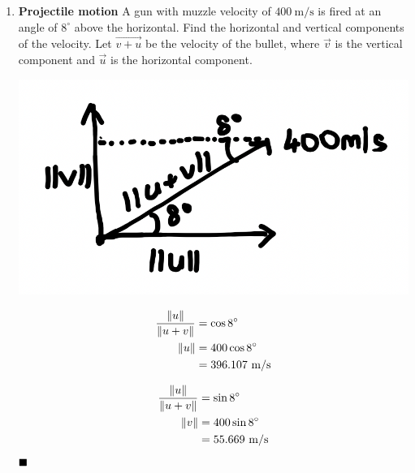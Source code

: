 \begin{enumerate}
    \item \textbf{Projectile motion} A gun with muzzle velocity of $400 \mathrm{~m} / \mathrm{s}$ is fired at an angle of $8^{\circ}$ above the horizontal. Find the horizontal and vertical components of the velocity.
          \sol{} Let $\vec{v + u}$ be the velocity of the bullet, where $\vec{v}$ is the vertical component and $\vec{u}$ is the horizontal component.
          \begin{multicols}{2}
              \begin{center}
                  \includegraphics[scale=0.5]{assets/thomas12.3q25.png}
              \end{center}
              \columnbreak
              \begin{align*}
                  \dfrac{\left\lVert u\right\rVert}{\left\lVert u + v\right\rVert} & = \cos 8^{\circ}                   \\
                  \left\lVert u\right\rVert                       & = 400 \cos 8^{\circ}               \\
                                                 & = 396.107 \mathrm{~m} / \mathrm{s}
              \end{align*}

              \begin{align*}
                  \dfrac{\left\lVert u\right\rVert}{\left\lVert u + v\right\rVert} & = \sin 8^{\circ}                  \\
                  \left\lVert v\right\rVert                       & = 400 \sin 8^{\circ}              \\
                                                 & = 55.669 \mathrm{~m} / \mathrm{s}
              \end{align*}
              $\hfill\blacksquare$
          \end{multicols}


\end{enumerate}
